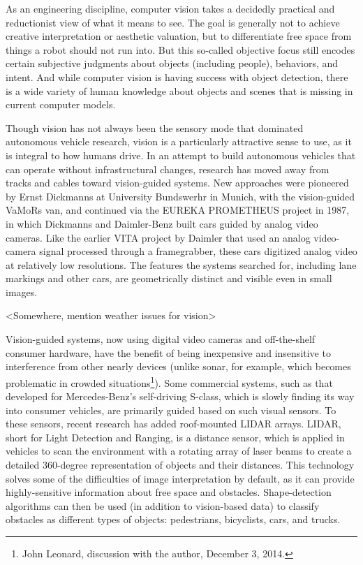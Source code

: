 As an engineering discipline, computer vision takes a decidedly
practical and reductionist view of what it means to see. The goal is
generally not to achieve creative interpretation or aesthetic
valuation, but to differentiate free space from things a robot should
not run into.\cite{???} But this so-called objective focus still encodes
certain subjective judgments about objects (including people),
behaviors, and intent. And while computer vision is having success
with object detection, there is a wide variety of human knowledge
about objects and scenes that is missing in current computer models.\cite{???}

Though vision has not always been the sensory mode that dominated
autonomous vehicle research, vision is a particularly attractive sense to
use, as it is integral to how humans drive. In an attempt to build
autonomous vehicles that can operate without infrastructural changes,
research has moved away from tracks and cables toward vision-guided
systems. New approaches were pioneered by Ernst Dickmanns at
University Bundswerhr in Munich, with the vision-guided VaMoRs van,
and continued via the EUREKA PROMETHEUS project in 1987, in which
Dickmanns and Daimler-Benz built cars guided by analog video
cameras.\cite{???} Like the earlier VITA project by Daimler that used an
analog video-camera signal processed through a framegrabber, these
cars digitized analog video at relatively low resolutions. The
features the systems searched for, including lane markings and other
cars, are geometrically distinct and visible even in small images.\cite{???}

<Somewhere, mention weather issues for vision>

Vision-guided systems, now using digital video cameras and
off-the-shelf consumer hardware, have the benefit of being inexpensive
and insensitive to interference from other nearly devices (unlike
sonar, for example, which becomes problematic in crowded
situations\footnote{John Leonard, discussion with the author, December
3, 2014.}). Some commercial systems, such as that developed for Mercedes-Benz's
self-driving S-class, which is slowly finding its way into consumer
vehicles, are primarily guided based on such visual sensors.\cite{???} To
these sensors, recent research has added roof-mounted LIDAR arrays.
LIDAR, short for Light Detection and Ranging, is a distance
sensor, which is applied in vehicles to scan the environment with a
rotating array of laser beams to create a detailed 360-degree
representation of objects and their distances. This technology
solves some of the difficulties of image interpretation by default, as
it can provide highly-sensitive information about free space and
obstacles. Shape-detection algorithms can then be used (in addition to
vision-based data) to classify obstacles as different types of
objects: pedestrians, bicyclists, cars, and trucks.\cite{???}

